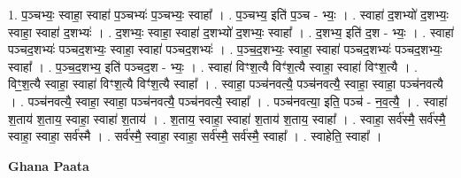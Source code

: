 \documentclass[17pt]{extarticle}
\begin{document}
1. प॒ञ्चभ्यः॒ स्वाहा॒ स्वाहा॑ प॒ञ्चभ्यः॑ प॒ञ्चभ्यः॒ स्वाहा᳚ । . प॒ञ्चभ्य॒ इति॑ प॒ञ्च - भ्यः॒ । . स्वाहा॑ द॒शभ्यो॑ द॒शभ्यः॒ स्वाहा॒ स्वाहा॑ द॒शभ्यः॑ । . द॒शभ्यः॒ स्वाहा॒ स्वाहा॑ द॒शभ्यो॑ द॒शभ्यः॒ स्वाहा᳚ । . द॒शभ्य॒ इति॑ द॒श - भ्यः॒ । . स्वाहा॑ पञ्चद॒शभ्यः॑ पञ्चद॒शभ्यः॒ स्वाहा॒ स्वाहा॑ पञ्चद॒शभ्यः॑ । . प॒ञ्च॒द॒शभ्यः॒ स्वाहा॒ स्वाहा॑ पञ्चद॒शभ्यः॑ पञ्चद॒शभ्यः॒ स्वाहा᳚ । . प॒ञ्च॒द॒शभ्य॒ इति॑ पञ्चद॒श - भ्यः॒ । . स्वाहा॑ विꣳश॒त्यै विꣳ॑श॒त्यै स्वाहा॒ स्वाहा॑ विꣳश॒त्यै । . विꣳ॒॒श॒त्यै स्वाहा॒ स्वाहा॑ विꣳश॒त्यै विꣳ॑श॒त्यै स्वाहा᳚ । . स्वाहा॒ पञ्च॑नवत्यै॒ पञ्च॑नवत्यै॒ स्वाहा॒ स्वाहा॒ पञ्च॑नवत्यै । . पञ्च॑नवत्यै॒ स्वाहा॒ स्वाहा॒ पञ्च॑नवत्यै॒ पञ्च॑नवत्यै॒ स्वाहा᳚ । . पञ्च॑नवत्या॒ इति॒ पञ्च॑ - न॒व॒त्यै॒ । . स्वाहा॑ श॒ताय॑ श॒ताय॒ स्वाहा॒ स्वाहा॑ श॒ताय॑ । . श॒ताय॒ स्वाहा॒ स्वाहा॑ श॒ताय॑ श॒ताय॒ स्वाहा᳚ । . स्वाहा॒ सर्व॑स्मै॒ सर्व॑स्मै॒ स्वाहा॒ स्वाहा॒ सर्व॑स्मै । . सर्व॑स्मै॒ स्वाहा॒ स्वाहा॒ सर्व॑स्मै॒ सर्व॑स्मै॒ स्वाहा᳚ । . स्वाहेति॒ स्वाहा᳚ । \newline

\textbf{Ghana Paata } \newline
\end{document}
